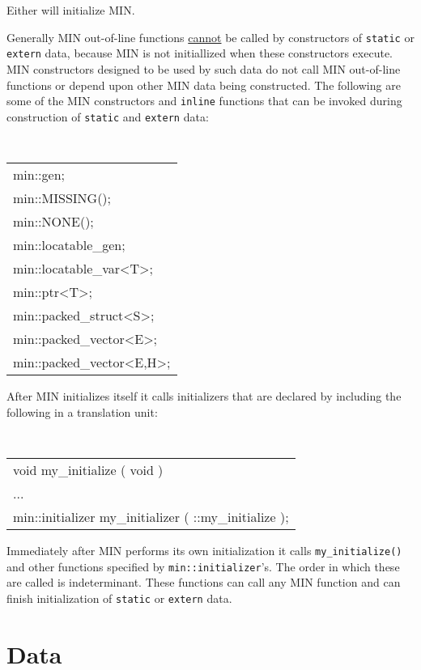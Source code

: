 \documentclass[12pt]{article}
\newcommand{\EOL}{\penalty \exhyphenpenalty}
\begin{document}
Either will initialize MIN.

Generally MIN out-of-line functions \underline{cannot} be called
by constructors of {\tt static} or {\tt extern} data, because
MIN is not initiallized when these constructors execute.
MIN constructors designed to be used by such data do not call
MIN out-of-line functions or depend upon other MIN data being
constructed.  The following are some of the MIN constructors
and {\tt inline} functions that can be invoked during construction
of {\tt static} and {\tt extern} data:
\begin{center}
\tt
\begin{tabular}{l}
min::gen; \\
min::MISSING(); \\
min::NONE(); \\
min::locatable\_gen; \\
min::locatable\_var<T>; \\
min::ptr<T>; \\
min::packed\_struct<S>; \\
min::packed\_vector<E>; \\
min::packed\_vector<E,H>; \\
\end{tabular}
\end{center}

After MIN initializes itself it calls initializers that are
declared by including the following in a translation unit:

\begin{center}
\tt
\begin{tabular}{l}
void my\_initialize ( void ) \\
{ ... } \\
min::initializer my\_initializer ( ::my\_initialize ); \\
\end{tabular}
\end{center}

Immediately after MIN performs its own initialization
it calls {\tt my\_initialize()} and other functions specified by
{\tt min::\EOL initializer}'s.  The order in which these
are called is indeterminant.  These functions can call any
MIN function and can finish initialization of {\tt static} or
{\tt extern} data.

\section{Data}
\end{document}
